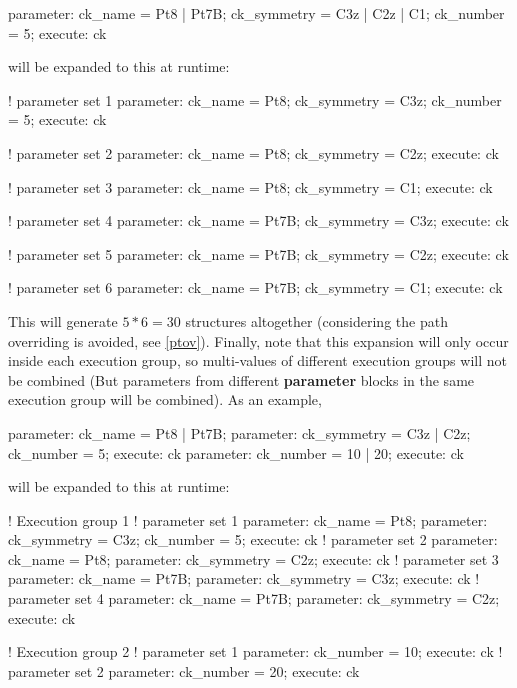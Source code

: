 \documentclass[11pt]{book}
\begin{document}
\begin{everbatim}
{ parameter: 
   ck_name = Pt8 | Pt7B;
   ck_symmetry = C3z | C2z | C1;
   ck_number = 5;
}
{ execute: ck }
\end{everbatim}

will be expanded to this at runtime:

\begin{everbatim}

! parameter set 1
  { parameter: 
   ck_name = Pt8;
   ck_symmetry = C3z;
   ck_number = 5;
  }
  { execute: ck }
  
! parameter set 2
  { parameter: ck_name = Pt8; ck_symmetry = C2z; }
  { execute: ck }
  
! parameter set 3
  { parameter: ck_name = Pt8; ck_symmetry = C1; }
  { execute: ck }
  
! parameter set 4
  { parameter: ck_name = Pt7B; ck_symmetry = C3z; }
  { execute: ck }
  
! parameter set 5
  { parameter: ck_name = Pt7B; ck_symmetry = C2z; }
  { execute: ck }
  
! parameter set 6
  { parameter: ck_name = Pt7B; ck_symmetry = C1; }
  { execute: ck }
\end{everbatim}

This will generate $5*6=30$ structures altogether (considering the path overriding is avoided, see \ref{ptov}). 
Finally, note that this expansion will only occur inside each execution group, so multi-values of different execution groups will 
not be combined (But parameters from different \textbf{parameter} blocks in the same execution group will be combined). As an example, 

\begin{everbatim}
{ parameter: ck_name = Pt8 | Pt7B; }
{ parameter: ck_symmetry = C3z | C2z; ck_number = 5; }
{ execute: ck }
{ parameter:  ck_number = 10 | 20; }
{ execute: ck }
\end{everbatim}

will be expanded to this at runtime:

\begin{everbatim}
! Execution group 1
  ! parameter set 1
    { parameter: ck_name = Pt8; }
    { parameter: ck_symmetry = C3z; ck_number = 5; }
    { execute: ck }
  ! parameter set 2
    { parameter: ck_name = Pt8; }
    { parameter: ck_symmetry = C2z; }
    { execute: ck }
  ! parameter set 3
    { parameter: ck_name = Pt7B; }
    { parameter: ck_symmetry = C3z; }
    { execute: ck }
  ! parameter set 4
    { parameter: ck_name = Pt7B; }
    { parameter: ck_symmetry = C2z; }
    { execute: ck }

! Execution group 2
  ! parameter set 1
    { parameter: ck_number = 10; }
    { execute: ck }
  ! parameter set 2
    { parameter: ck_number = 20; }
    { execute: ck }
\end{everbatim}
\end{document}
